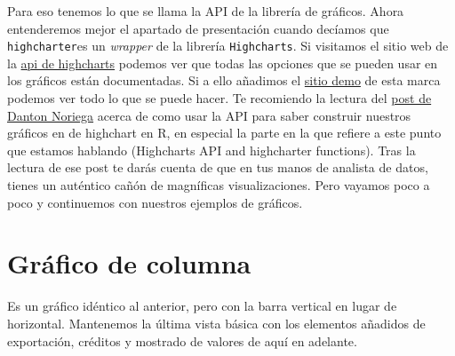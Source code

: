 \documentclass[
]{book}
\newenvironment{Shaded}{\begin{snugshade}}{\end{snugshade}}
\newcommand{\AttributeTok}[1]{\textcolor[rgb]{0.77,0.63,0.00}{#1}}
\newcommand{\ConstantTok}[1]{\textcolor[rgb]{0.00,0.00,0.00}{#1}}
\newcommand{\FunctionTok}[1]{\textcolor[rgb]{0.00,0.00,0.00}{#1}}
\newcommand{\NormalTok}[1]{#1}
\newcommand{\SpecialCharTok}[1]{\textcolor[rgb]{0.00,0.00,0.00}{#1}}
\newcommand{\StringTok}[1]{\textcolor[rgb]{0.31,0.60,0.02}{#1}}
\begin{document}
Para eso tenemos lo que se llama la API de la librería de gráficos. Ahora entenderemos mejor el apartado de presentación cuando decíamos que \texttt{highcharter}es un \emph{wrapper} de la librería \texttt{Highcharts}. Si visitamos el sitio web de la \href{https://api.highcharts.com}{api de highcharts} podemos ver que todas las opciones que se pueden usar en los gráficos están documentadas. Si a ello añadimos el \href{https://highcharts.com/demo}{sitio demo} de esta marca podemos ver todo lo que se puede hacer. Te recomiendo la lectura del \href{https://dantonnoriega.github.io/ultinomics.org/posts/2017-04-05-highcharter-explainer.html}{post de Danton Noriega} acerca de como usar la API para saber construir nuestros gráficos en de highchart en R, en especial la parte en la que refiere a este punto que estamos hablando (Highcharts API and highcharter functions). Tras la lectura de ese post te darás cuenta de que en tus manos de analista de datos, tienes un auténtico cañón de magníficas visualizaciones. Pero vayamos poco a poco y continuemos con nuestros ejemplos de gráficos.

\hypertarget{gruxe1fico-de-columna}{%
\section{Gráfico de columna}\label{gruxe1fico-de-columna}}

Es un gráfico idéntico al anterior, pero con la barra vertical en lugar de horizontal. Mantenemos la última vista básica con los elementos añadidos de exportación, créditos y mostrado de valores de aquí en adelante.

\begin{Shaded}
\end{Shaded}
\end{document}

